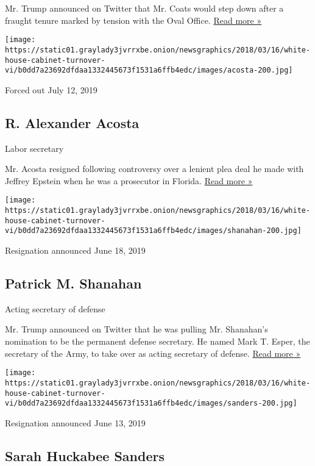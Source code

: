 Mr. Trump announced on Twitter that Mr. Coats would step down after a
fraught tenure marked by tension with the Oval Office.
\href{https://www.nytimes3xbfgragh.onion/2019/07/28/us/politics/dan-coats-intelligence-chief-out.html?action=click\&module=Top\%20Stories\&pgtype=Homepage}{Read
more »}

\texttt{[image: https://static01.graylady3jvrrxbe.onion/newsgraphics/2018/03/16/white-house-cabinet-turnover-vi/b0dd7a23692dfdaa1332445673f1531a6ffb4edc/images/acosta-200.jpg]}

Forced out July 12, 2019

\hypertarget{r-alexander-acosta}{%
\subsection{R. Alexander Acosta}\label{r-alexander-acosta}}

Labor secretary

Mr. Acosta resigned following controversy over a lenient plea deal he
made with Jeffrey Epstein when he was a prosecutor in Florida.
\href{https://www.nytimes3xbfgragh.onion/2019/07/12/us/politics/acosta-resigns-trump.html}{Read
more »}

\texttt{[image: https://static01.graylady3jvrrxbe.onion/newsgraphics/2018/03/16/white-house-cabinet-turnover-vi/b0dd7a23692dfdaa1332445673f1531a6ffb4edc/images/shanahan-200.jpg]}

Resignation announced June 18, 2019

\hypertarget{patrick-m-shanahan}{%
\subsection{Patrick M. Shanahan}\label{patrick-m-shanahan}}

Acting secretary of defense

Mr. Trump announced on Twitter that he was pulling Mr. Shanahan's
nomination to be the permanent defense secretary. He named Mark T.
Esper, the secretary of the Army, to take over as acting secretary of
defense.
\href{https://www.nytimes3xbfgragh.onion/2019/06/18/us/politics/patrick-shanahan-defense-secretary.html}{Read
more »}

\texttt{[image: https://static01.graylady3jvrrxbe.onion/newsgraphics/2018/03/16/white-house-cabinet-turnover-vi/b0dd7a23692dfdaa1332445673f1531a6ffb4edc/images/sanders-200.jpg]}

Resignation announced June 13, 2019

\hypertarget{sarah-huckabee-sanders}{%
\subsection{Sarah Huckabee Sanders}\label{sarah-huckabee-sanders}}

